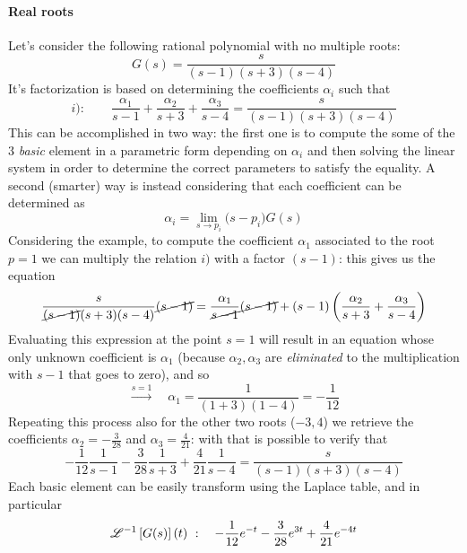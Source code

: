 	\paragraph{Real roots} Let's consider the following rational polynomial with no multiple roots:
	\[ G(s) = \frac{s}{(s-1)(s+3)(s-4)} \]
	It's factorization is based on determining the coefficients $\alpha_i$ such that
	\[ i): \qquad \frac{\alpha_1}{s-1} + \frac{\alpha_2}{s+3} + \frac{\alpha_3}{s-4} = \frac{s}{(s-1)(s+3)(s-4)} \]
	This can be accomplished in two way: the first one is to compute the some of the 3 \textit{basic} element in a parametric form depending on $\alpha_i$ and then solving the linear system in order to determine the correct parameters to satisfy the equality. A second (smarter) way is instead considering that each coefficient can be determined as
	\[ \alpha_i = \lim_{s\rightarrow p_i} \big(s-p_i\big) G(s) \]
	Considering the example, to compute the coefficient $\alpha_1$ associated to the root $p = 1$ we can multiply the relation $i)$ with a factor $(s-1)$: this gives us the equation
	\[ \frac{s}{\cancel{(s-1)}(s+3)(s-4)} \cancel{(s-1)}= \frac{\alpha_1}{\cancel{s-1}} \cancel{(s-1)} + {(s-1) \left( \frac{\alpha_2}{s+3} + \frac{\alpha_3}{s-4} \right)}  \]
	Evaluating this expression at the point $s=1$ will result in an equation whose only unknown coefficient is $\alpha_1$ (because $\alpha_2,\alpha_3$ are \textit{eliminated} to the multiplication with $s-1$ that goes to zero), and so
	\[\xrightarrow{s=1} \quad \alpha_1 = \frac{1}{(1+3)(1-4)} = -\frac 1 {12} \]
	Repeating this process also for the other two roots ($-3,4$) we retrieve the coefficients $\alpha_2 = -\frac 3 {28}$ and $\alpha_3 = \frac 4 {21}$: with that is possible to verify that
	\[ -\frac 1 {12} \frac 1 {s-1} - \frac 3 {28} \frac 1 {s+3} + \frac 4 {21} \frac{1}{s-4} = \frac{s}{(s-1)(s+3)(s-4)} \]
	Each basic element can be easily transform using the Laplace table, and in particular
	\[ \mathscr{L}^{-1} \left[ G(s) \right](t) \ : \quad -\frac 1 {12} e^{-t} - \frac 3{28} e^{3t} + \frac 4 {21} e^{-4t} \]
	

